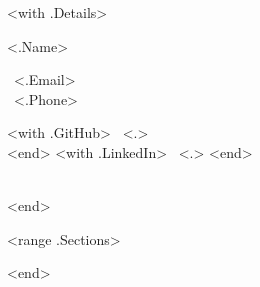 \documentclass[letterpaper]{article}
\begin{document}
<with .Details>
\begin{minipage}[t][0.8cm][c]{.45\textwidth}
{\centering \fontsize{36pt}{42pt}\selectfont <.Name>}
\end{minipage}
\begin{minipage}[t][0.8cm][c]{0.32\textwidth}
{\fontsize{14}{18}\selectfont
\faEnvelope \ <.Email>
\vspace{6 pt}\\
\faPhone \ <.Phone>}
\end{minipage}
\begin{minipage}[t][0.8cm][c]{0.30\textwidth}
{
    \fontsize{14}{18}\selectfont
    <with .GitHub> \faGithub \ <.> \vspace{6 pt}\\ <end>
    <with .LinkedIn> \faLinkedin \ <.> <end>
}
\end{minipage}
\vspace{6 pt}\\
\noindent\makebox[\linewidth]{\rule{\paperwidth}{0.4pt}}
<end>

\begin{minipage}[t]{0.33\textwidth}

\end{minipage}

\begin{minipage}[t]{0.67\textwidth}
<range .Sections>


<end>
\end{minipage}
\end{document}
